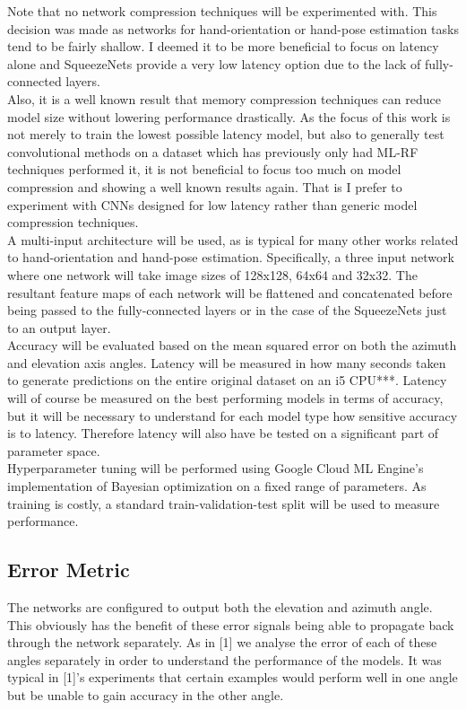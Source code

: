 \documentclass{article}
\begin{document}
Note that no network compression techniques will be experimented with. This decision was made as networks for hand-orientation or hand-pose estimation tasks tend to be fairly shallow. I deemed it to be more beneficial to focus on latency alone and SqueezeNets provide a very low latency option due to the lack of fully-connected layers.\\

Also, it is a well known result that memory compression techniques can reduce model size without lowering performance drastically. As the focus of this work is not merely to train the lowest possible latency model, but also to generally test convolutional methods on a dataset which has previously only had ML-RF techniques performed it, it is not beneficial to focus too much on model compression and showing a well known results again. That is I prefer to experiment with CNNs designed for low latency rather than generic model compression techniques.\\

A multi-input architecture will be used, as is typical for many other works related to hand-orientation and hand-pose estimation. Specifically, a three input network where one network will take image sizes of 128x128, 64x64 and 32x32. The resultant feature maps of each network will be flattened and concatenated before being passed to the fully-connected layers or in the case of the SqueezeNets just to an output layer.\\

Accuracy will be evaluated based on the mean squared error on both the azimuth and elevation axis angles. Latency will be measured in how many seconds taken to generate predictions on the entire original dataset on an i5 CPU***. Latency will of course be measured on the best performing models in terms of accuracy, but it will be necessary to understand for each model type how sensitive accuracy is to latency. Therefore latency will also have be tested on a significant part of parameter space.\\

Hyperparameter tuning will be performed using Google Cloud ML Engine's implementation of Bayesian optimization on a fixed range of parameters. As training is costly, a standard train-validation-test split will be used to measure performance.\\

\subsection{Error Metric}
The networks are configured to output both the elevation and azimuth angle. This obviously has the benefit of these error signals being able to propagate back through the network separately. As in [1] we analyse the error of each of these angles separately in order to understand the performance of the models. It was typical in [1]'s experiments that certain examples would perform well in one angle but be unable to gain accuracy in the other angle.\\
\end{document}
